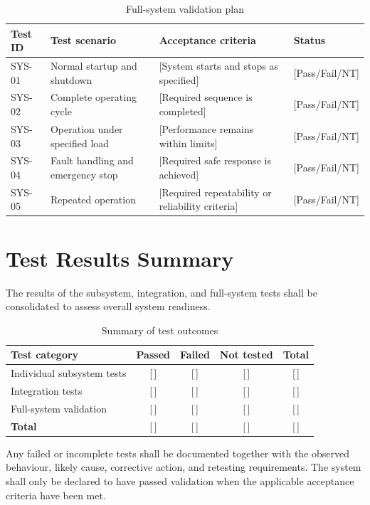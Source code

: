 \begin{table}[htbp]
    \centering
    \caption{Full-system validation plan}
    \label{tab:system-validation}
    \renewcommand{\arraystretch}{1.4}
    \begin{tabularx}{\textwidth}{|l|X|X|X|}
        \hline
        \textbf{Test ID} &
        \textbf{Test scenario} &
        \textbf{Acceptance criteria} &
        \textbf{Status} \\
        \hline
        SYS-01 & Normal startup and shutdown &
        [System starts and stops as specified] &
        [Pass/Fail/NT] \\
        \hline
        SYS-02 & Complete operating cycle &
        [Required sequence is completed] &
        [Pass/Fail/NT] \\
        \hline
        SYS-03 & Operation under specified load &
        [Performance remains within limits] &
        [Pass/Fail/NT] \\
        \hline
        SYS-04 & Fault handling and emergency stop &
        [Required safe response is achieved] &
        [Pass/Fail/NT] \\
        \hline
        SYS-05 & Repeated operation &
        [Required repeatability or reliability criteria] &
        [Pass/Fail/NT] \\
        \hline
    \end{tabularx}
\end{table}


\section{Test Results Summary}
\label{sec:test-results-summary}

The results of the subsystem, integration, and full-system tests
shall be consolidated to assess overall system readiness.

\begin{table}[htbp]
    \centering
    \caption{Summary of test outcomes}
    \label{tab:test-summary}
    \renewcommand{\arraystretch}{1.4}
    \begin{tabularx}{\textwidth}{|X|c|c|c|c|}
        \hline
        \textbf{Test category} &
        \textbf{Passed} &
        \textbf{Failed} &
        \textbf{Not tested} &
        \textbf{Total} \\
        \hline
        Individual subsystem tests & [\,] & [\,] & [\,] & [\,] \\
        \hline
        Integration tests & [\,] & [\,] & [\,] & [\,] \\
        \hline
        Full-system validation & [\,] & [\,] & [\,] & [\,] \\
        \hline
        \textbf{Total} & [\,] & [\,] & [\,] & [\,] \\
        \hline
    \end{tabularx}
\end{table}

Any failed or incomplete tests shall be documented together with
the observed behaviour, likely cause, corrective action, and
retesting requirements. The system shall only be declared to have
passed validation when the applicable acceptance criteria have
been met.
